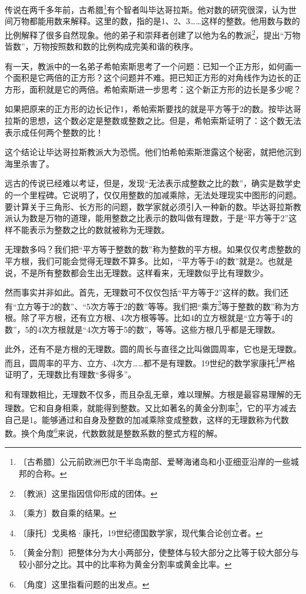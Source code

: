 \documentclass[12pt,UTF-8,openany]{ctexbook}
\begin{document}
\begin{normalsize}
    
    传说在两千多年前，古希腊\footnote{〔古希腊〕公元前欧洲巴尔干半岛南部、爱琴海诸岛和小亚细亚沿岸的一些城邦的合称。}有个智者叫毕达哥拉斯。他对数的研究很深，认为世间万物都能用数来解释。这里的数，指的是1、2、3……这样的整数。他用数与数的比例解释了很多自然现象。他的弟子和崇拜者创建了以他为名的教派\footnote{〔教派〕这里指因信仰形成的团体。}，提出“万物皆数”，万物按照数和数的比例构成完美和谐的秩序。
    
    有一天，教派中的一名弟子希帕索斯思考了一个问题：已知一个正方形，如何画一个面积是它两倍的正方形？这个问题并不难。把已知正方形的对角线作为边长的正方形，面积就是它的两倍。希帕索斯进一步思考：这个新正方形的边长是多少呢？
    
    如果把原来的正方形的边长记作1，希帕索斯要找的就是平方等于2的数。按毕达哥拉斯的思想，这个数必定是整数或整数之比。但是，希帕索斯证明了：这个数无法表示成任何两个整数的比！
    
    这个结论让毕达哥拉斯教派大为恐慌。他们怕希帕索斯泄露这个秘密，就把他沉到海里杀害了。
    
    远古的传说已经难以考证，但是，发现“无法表示成整数之比的数”，确实是数学史的一个里程碑。它说明了，仅仅用整数的加减乘除，无法处理现实中图形的问题。要计算关于三角形、长方形的问题，数学家就必须引入一种新的数。毕达哥拉斯教派认为数是万物的道理，能用整数之比表示的数叫做有理数，于是“平方等于2”这样不能表示为整数之比的数就被称为无理数。
    
    无理数多吗？我们把“平方等于整数的数”称为整数的平方根。如果仅仅考虑整数的平方根，我们可能会觉得无理数不算多。比如，“平方等于4的数”就是2。也就是说，不是所有整数都会生出无理数。这样看来，无理数似乎比有理数少。
    
    然而事实并非如此。首先，无理数可不仅仅包括“平方等于2”这样的数。我们还有“立方等于2的数”、“5次方等于2的数”等等。我们把“乘方\footnote{〔乘方〕数自乘的结果。}等于整数的数”称为方根。除了平方根，还有立方根、4次方根等等。比如4的立方根就是“立方等于4的数”，5的4次方根就是“4次方等于5的数”，等等。这些方根几乎都是无理数。
    
    此外，还有不是方根的无理数。圆的周长与直径之比叫做圆周率，它也是无理数。而且，圆周率的平方、立方、4次方……都不是有理数。19世纪的数学家康托\footnote{〔康托〕戈奥格·康托，19世纪德国数学家，现代集合论创立者。}严格证明了，无理数比有理数“多得多”。
    
    和有理数相比，无理数不仅多，而且杂乱无章，难以理解。方根是最容易理解的无理数。它和自身相乘，就能得到整数。又比如著名的黄金分割率\footnote{〔黄金分割〕把整体分为大小两部分，使整体与较大部分之比等于较大部分与较小部分之比。其中的比率称为黄金分割率或黄金比率。}，它的平方减去自己是1。能够通过和自身及整数的加减乘除变成整数，这样的无理数称为代数数。换个角度\footnote{〔角度〕这里指看问题的出发点。}来说，代数数就是整数系数的整式方程的解。
    

\end{normalsize}
\end{document}
